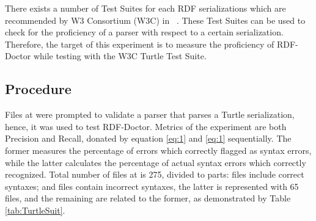 There exists a number of Test Suites for each RDF serializations which are recommended by W3 Consortium (W3C) in ~\cite{TurtleTests:Online}.
These Test Suites can be used to check for the proficiency of a parser with respect to a certain serialization.%
Therefore, the target of this experiment is to measure the proficiency of RDF-Doctor while testing with the W3C Turtle Test Suite.

\subsection{Procedure}

Files at \cite{TurtleTests:Online} were prompted to validate a parser that parses a Turtle serialization, hence, it was used to test RDF-Doctor. 
Metrics of the experiment are both Precision and Recall, donated by equation \ref{eq:1} and \ref{eq:1} sequentially. The former measures the percentage of errors which correctly flagged as syntax errors, while the latter calculates the percentage of actual syntax errors which correctly recognized. Total number of files at \cite{TurtleTests:Online} is 275, divided to parts: files include  correct syntaxes; and files contain incorrect syntaxes, the latter is represented with 65 files, and the remaining are related to the former, as demonstrated by Table \ref{tab:TurtleSuit}. 
 
